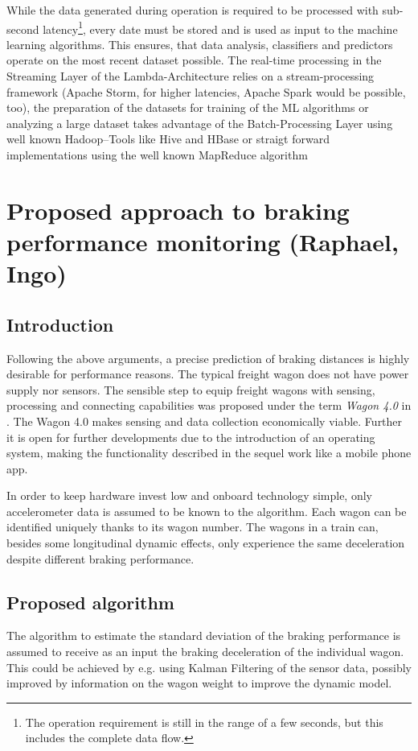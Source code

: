 \documentclass[a4paper, 12pt]{scrartcl}
\begin{document}
While the data generated during operation is required to be processed with sub-second latency\footnote{The operation requirement is still in the range of a few seconds, but this includes the complete data flow.}, every date must be stored and is used as input to the machine learning algorithms. This ensures, that data analysis, classifiers and predictors operate on the most recent dataset possible. The real-time processing in the Streaming Layer of the Lambda-Architecture relies on a stream-processing framework (Apache Storm, for higher latencies, Apache Spark would be possible, too), the preparation of the datasets for training of the ML algorithms or analyzing a large dataset takes advantage of the Batch-Processing Layer using well known Hadoop--Tools like Hive and HBase or straigt forward implementations using the well known MapReduce algorithm \cite{Dean:2004:MSD:1251254.1251264}

\section{Proposed approach to braking performance monitoring (Raphael, Ingo)}
\subsection{Introduction}
Following the above arguments, a precise prediction of braking distances is highly desirable for performance reasons. The typical freight wagon does not have power supply nor sensors. The sensible step to equip freight wagons with sensing, processing and connecting capabilities was proposed under the term \textit{Wagon 4.0} in \cite{pfaff2017stephenson}. The Wagon 4.0 makes sensing and data collection economically viable. Further it is open for further developments due to the introduction of an operating system, making the functionality described in the sequel work like a mobile phone app.

In order to keep hardware invest low and onboard technology simple, only accelerometer data is assumed to be known to the algorithm. Each wagon can be identified uniquely thanks to its wagon number. The wagons in a train can, besides some longitudinal dynamic effects, only experience the same deceleration despite different braking performance.

\subsection{Proposed algorithm}
The algorithm to estimate the standard deviation of the braking performance is assumed to receive as an input the braking deceleration of the individual wagon. This could be achieved by e.g. using Kalman Filtering of the sensor data, possibly improved by information on the wagon weight to improve the dynamic model.
\end{document}
